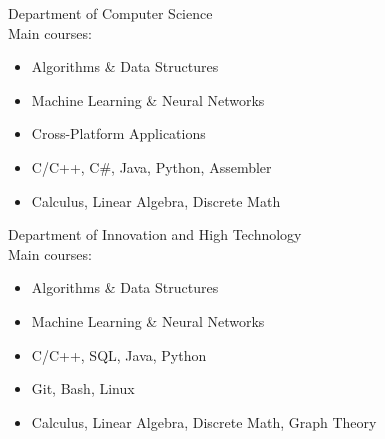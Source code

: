 \documentclass[10pt,a4paper,ragged2e]{altacv}
\begin{document}

Department of Computer Science\\
\smallskip
Main courses:
\smallskip
\begin{itemize}
    \item Algorithms \& Data Structures
    \item Machine Learning \& Neural Networks
    \item Cross-Platform Applications
    \item C/C++, C\#, Java, Python, Assembler
    \item Calculus, Linear Algebra, Discrete Math
\end{itemize}

\bigskip

Department of Innovation and High Technology\\
\smallskip
Main courses:
\smallskip
\begin{itemize}
    \item Algorithms \& Data Structures
    \item Machine Learning \& Neural Networks
    \item C/C++, SQL, Java, Python
    \item Git, Bash, Linux
    \item Calculus, Linear Algebra, Discrete Math, Graph Theory
\end{itemize}
\end{document}
